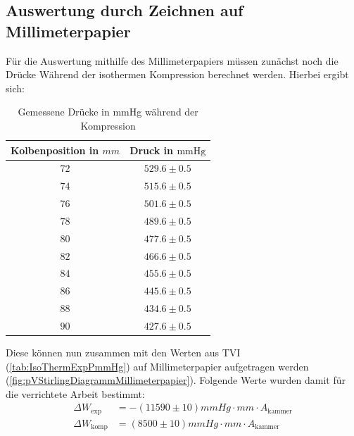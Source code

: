 \documentclass{report}
\begin{document}
\subsection{Auswertung durch Zeichnen auf Millimeterpapier}
Für die Auswertung mithilfe des Millimeterpapiers müssen zunächst noch die Drücke Während der isothermen Kompression berechnet werden. Hierbei ergibt sich:
\begin{table}[H]
        \begin{center}
                \begin{tabular}{|c|c|}
                        \hline
                        Kolbenposition in $mm$ & Druck in $\mathrm{mmHg}$ \\
                        \hline
                        $72$ & $529.6 \pm 0.5$ \\
                        \hline
                        $74$ & $515.6 \pm 0.5$ \\
                        \hline
                        $76$ & $501.6 \pm 0.5$ \\
                        \hline
                        $78$ & $489.6 \pm 0.5$ \\
                        \hline
                        $80$ & $477.6 \pm 0.5$ \\
                        \hline
                        $82$ & $466.6 \pm 0.5$ \\
                        \hline
                        $84$ & $455.6 \pm 0.5$ \\
                        \hline
                        $86$ & $445.6 \pm 0.5$ \\
                        \hline
                        $88$ & $434.6 \pm 0.5$ \\
                        \hline
                        $90$ & $427.6 \pm 0.5$ \\
                        \hline
                \end{tabular}
        \end{center}
        \caption{Gemessene Drücke in mmHg während der Kompression}
        \label{tab:ThermKompPmmHg}
\end{table}
\noindent
Diese können nun zusammen mit den Werten aus TVI (\ref{tab:IsoThermExpPmmHg}) auf Millimeterpapier aufgetragen werden (\ref{fig:pVStirlingDiagrammMillimeterpapier}).
Folgende Werte wurden damit für die verrichtete Arbeit bestimmt:
\begin{equation}
    \begin{split}
        \Delta W_{\mathrm{exp}} &= -(11590 \pm 10) \si{mmHg} \cdot \si{mm} \cdot A_{\mathrm{kammer}}\\
        \Delta W_{\mathrm{komp}} &= (8500 \pm 10) \si{mmHg} \cdot \si{mm} \cdot A_{\mathrm{kammer}}
    \end{split}
\end{equation}
\end{document}
